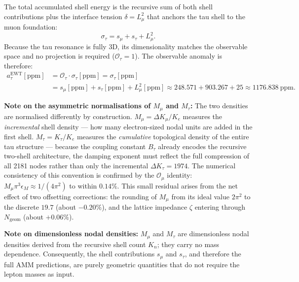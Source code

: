\documentclass[10pt,a4paper]{article}
\begin{document}
The total accumulated shell energy is the recursive sum of both shell
contributions plus the interface tension $\delta = L_\mu^2$ that anchors the
tau shell to the muon foundation:
\begin{equation}
	\sigma_{\tau}
	= s_{\mu} + s_{\tau} + L_{\mu}^{2}.
	\label{eq:sigma_tau}
\end{equation}
Because the tau resonance is fully 3D, its dimensionality matches the
observable space and no projection is required ($\mathcal{O}_\tau = 1$).
The observable anomaly is therefore:
\begin{equation}
	\begin{aligned}
		a_{\tau}^{\text{EWT}}[\text{ppm}]
		&= \mathcal{O}_{\tau}\cdot\sigma_{\tau}[\text{ppm}]
		= \sigma_{\tau}[\text{ppm}] \\
		&= s_{\mu}[\text{ppm}] + s_{\tau}[\text{ppm}]
		+ L_{\mu}^{2}[\text{ppm}]
		\approx 248.571 + 903.267 + 25
		\approx 1176.838\ \text{ppm}.
	\end{aligned}
	\label{eq:atau_master}
\end{equation}

\smallskip
\noindent
\textbf{Note on the asymmetric normalisations of $M_\mu$ and $M_\tau$:}
The two densities are normalised differently by construction.
$M_\mu = \Delta K_\mu / K_e$ measures the \emph{incremental} shell density
--- how many electron-sized nodal units are added in the first shell.
$M_\tau = K_\tau / K_e$ measures the \emph{cumulative} topological density
of the entire tau structure --- because the coupling constant $B_\tau$
already encodes the recursive two-shell architecture, the damping exponent
must reflect the full compression of all 2181 nodes rather than only the
incremental $\Delta K_\tau = 1974$.
The numerical consistency of this convention is confirmed by the
$\mathcal{O}_\mu$ identity: $M_\mu \pi^3 \epsilon_M \approx 1/(4\pi^2)$
to within $0.14\%$. This small residual arises from the net effect of two
offsetting corrections: the rounding of $M_\mu$ from its ideal value
$2\pi^2$ to the discrete $19.7$ (about $-0.20\%$), and the lattice
impedance $\zeta$ entering through $N_{\text{geom}}$ (about $+0.06\%$).

\smallskip
\noindent
\textbf{Note on dimensionless nodal densities:} $M_\mu$ and $M_\tau$ are dimensionless nodal densities derived 
from the recursive shell count $K_n$; they carry no mass dependence. 
Consequently, the shell contributions $s_\mu$ and $s_\tau$, and therefore 
the full AMM predictions, are purely geometric quantities that do not require 
the lepton masses as input.
\end{document}
